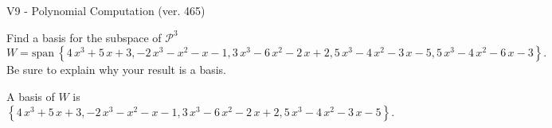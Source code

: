 \begin{exercise}
  \begin{exerciseTitle}V9 - Polynomial Computation (ver. 465)\end{exerciseTitle}
  \begin{exerciseStatement}
    Find a basis for the subspace of \(\mathcal{P}^3\) 
\[W=\mathrm{span}\ \left\{4 \, x^{3} + 5 \, x + 3 , -2 \, x^{3} - x^{2} - x - 1 , 3 \, x^{3} - 6 \, x^{2} - 2 \, x + 2 , 5 \, x^{3} - 4 \, x^{2} - 3 \, x - 5 , 5 \, x^{3} - 4 \, x^{2} - 6 \, x - 3\right\}.\]
 Be sure to explain why your result is a basis.


  \end{exerciseStatement}
  \begin{exerciseAnswer}
   A basis of \(W\) is  \(\left\{4 \, x^{3} + 5 \, x + 3 , -2 \, x^{3} - x^{2} - x - 1 , 3 \, x^{3} - 6 \, x^{2} - 2 \, x + 2 , 5 \, x^{3} - 4 \, x^{2} - 3 \, x - 5\right\}\).
  


  \end{exerciseAnswer}
\end{exercise}
